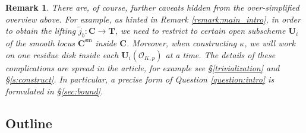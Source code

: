 \documentclass[11pt,oneside]{amsart}
\theoremstyle{plain}
\newtheorem{mainrmk}[mainthm]{Remark}
\theoremstyle{definition}
\DeclareMathOperator{\sm}{sm}
\def\TT{\mathbf{T}}
\def\F{\mathbb{F}}
\def\CC{\mathbf{C}}
\def\ra{\rightarrow}
\def\U{\mathbf{U}}
\def\oh{\mathcal{O}}
\def\longhookrightarrow{\lhook\joinrel\longrightarrow}
\begin{document}

\begin{mainrmk} 
There are, of course, further caveats hidden from the over-simplified overview above. For example, as hinted in Remark \ref{remark:main_intro}, in order to obtain the lifting $\widetilde j_b: \CC \ra \TT$, we need to restrict to certain open subscheme $\U_i$ of the smooth locus $\CC^{\sm}$ inside $\CC$. Moreover, when constructing $\kappa$, we will work on one residue disk inside each $\U_i(\oh_{K, p})$ at a time. The details of these complications are spread in the article, for example see \S \ref{trivialization} and \S \ref{s:construct}. In particular, a precise form of Question \ref{question:intro} is formulated in \S \ref{sec:bound}. 
\end{mainrmk}

\subsection{Outline}
\end{document}
